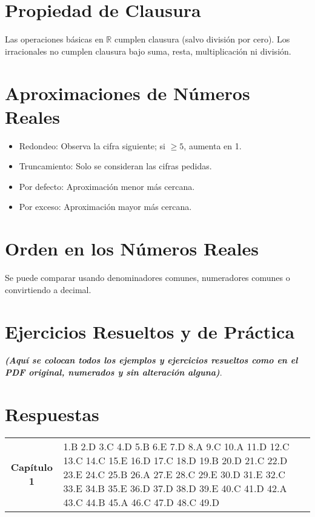 \documentclass[12pt]{article}
\begin{document}
\section*{Propiedad de Clausura}

Las operaciones básicas en $\mathbb{R}$ cumplen clausura (salvo división por cero). Los irracionales no cumplen clausura bajo suma, resta, multiplicación ni división.

\section*{Aproximaciones de Números Reales}

\begin{itemize}
  \item Redondeo: Observa la cifra siguiente; si $\geq 5$, aumenta en 1.
  \item Truncamiento: Solo se consideran las cifras pedidas.
  \item Por defecto: Aproximación menor más cercana.
  \item Por exceso: Aproximación mayor más cercana.
\end{itemize}

\section*{Orden en los Números Reales}

Se puede comparar usando denominadores comunes, numeradores comunes o convirtiendo a decimal.

\section*{Ejercicios Resueltos y de Práctica}

\textit{\textbf{(Aquí se colocan todos los ejemplos y ejercicios resueltos como en el PDF original, numerados y sin alteración alguna)}}.

\section*{Respuestas}

\begin{tabular}{|c|p{12cm}|}
\hline
\textbf{Capítulo 1} & 1.B 2.D 3.C 4.D 5.B 6.E 7.D 8.A 9.C 10.A 11.D 12.C 13.C 14.C 15.E 16.D 17.C 18.D 19.B 20.D 21.C 22.D 23.E 24.C 25.B 26.A 27.E 28.C 29.E 30.D 31.E 32.C 33.E 34.B 35.E 36.D 37.D 38.D 39.E 40.C 41.D 42.A 43.C 44.B 45.A 46.C 47.D 48.C 49.D
\end{tabular}
\end{document}
